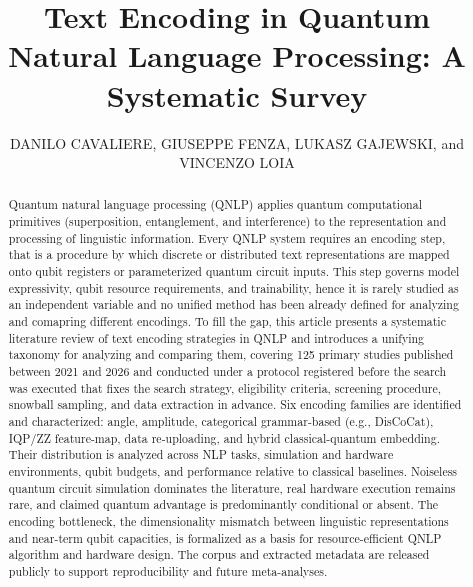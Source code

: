 \documentclass{ieeeaccess}
\begin{document}
 
\title{Text Encoding in Quantum Natural Language Processing: A Systematic Survey}

\author{\uppercase{Danilo Cavaliere}, \uppercase{Giuseppe Fenza}, \uppercase{Lukasz Gajewski}, and \uppercase{Vincenzo Loia}}

\address[1]{Department of Management \& Innovation Systems, Università degli Studi di Salerno, Italy}



\begin{abstract}
Quantum natural language processing (QNLP) applies quantum computational primitives (superposition, entanglement, and interference) to the representation and processing of linguistic information. Every QNLP system requires an encoding step, that is  a procedure by which discrete or distributed text representations are mapped onto qubit registers or parameterized quantum circuit inputs. This step governs model expressivity, qubit resource requirements, and trainability, hence it is rarely studied as an independent variable and no unified method has been already defined for analyzing and comapring different encodings. 
To fill the gap, this article presents a systematic literature review of text encoding strategies in QNLP and introduces a unifying taxonomy for analyzing and comparing them, covering 125 primary studies published between 2021 and 2026 and conducted under a protocol registered before the search was executed that fixes the search strategy, eligibility criteria, screening procedure, snowball sampling, and data extraction in advance. Six encoding families are identified and characterized: angle, amplitude, categorical grammar-based (e.g., DisCoCat), IQP/ZZ feature-map, data re-uploading, and hybrid classical-quantum embedding. Their distribution is analyzed across NLP tasks, simulation and hardware environments, qubit budgets, and performance relative to classical baselines. Noiseless quantum circuit simulation dominates the literature, real hardware execution remains rare, and claimed quantum advantage is predominantly conditional or absent. The encoding bottleneck, the dimensionality mismatch between linguistic representations and near-term qubit capacities, is formalized as a basis for resource-efficient QNLP algorithm and hardware design. The corpus and extracted metadata are released publicly to support reproducibility and future meta-analyses.


\end{abstract}
\end{document}
